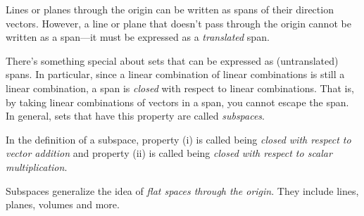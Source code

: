 Lines or planes through the origin can be written as spans
of their direction vectors. However, a line or plane that doesn't
pass through the origin cannot be written as a span---it must
be expressed as a \emph{translated} span.

\begin{center}
\end{center}


There's something special about sets that can be expressed as 
(untranslated) spans. In particular, since a linear combination
of linear combinations is still a linear combination, a span
is \emph{closed} with respect to linear combinations. That is, 
by taking linear combinations of vectors in a span, you cannot
escape the span. In general, sets that have this property are called
\emph{subspaces}.


In the definition of a subspace, property (i) is called
	being \emph{closed with respect to vector addition} and
	property (ii) is called being \emph{closed with respect to
	scalar multiplication}.

Subspaces generalize the idea of \emph{flat spaces through the origin}. They include 
lines, planes, volumes and more.

